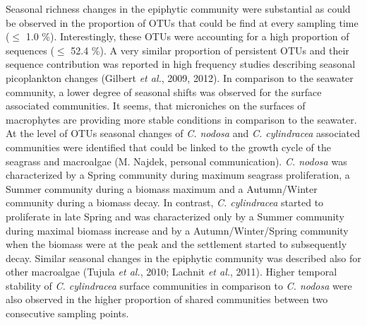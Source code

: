 \documentclass[12pt,]{article}
\begin{document}
Seasonal richness changes in the epiphytic community were substantial as
could be observed in the proportion of OTUs that could be find at every
sampling time (\(\leq\) 1.0 \si{\percent}). Interestingly, these OTUs
were accounting for a high proportion of sequences (\(\leq\) 52.4
\si{\percent}). A very similar proportion of persistent OTUs and their
sequence contribution was reported in high frequency studies describing
seasonal picoplankton changes (Gilbert \emph{et al.}, 2009, 2012). In
comparison to the seawater community, a lower degree of seasonal shifts
was observed for the surface associated communities. It seems, that
microniches on the surfaces of macrophytes are providing more stable
conditions in comparison to the seawater. At the level of OTUs seasonal
changes of \emph{C. nodosa} and \emph{C. cylindracea} associated
communities were identified that could be linked to the growth cycle of
the seagrass and macroalgae (M. Najdek, personal communication).
\emph{C. nodosa} was characterized by a Spring community during maximum
seagrass proliferation, a Summer community during a biomass maximum and
a Autumn/Winter community during a biomass decay. In contrast, \emph{C.
cylindracea} started to proliferate in late Spring and was characterized
only by a Summer community during maximal biomass increase and by a
Autumn/Winter/Spring community when the biomass were at the peak and the
settlement started to subsequently decay. Similar seasonal changes in
the epiphytic community was described also for other macroalgae (Tujula
\emph{et al.}, 2010; Lachnit \emph{et al.}, 2011). Higher temporal
stability of \emph{C. cylindracea} surface communities in comparison to
\emph{C. nodosa} were also observed in the higher proportion of shared
communities between two consecutive sampling points.
\end{document}
